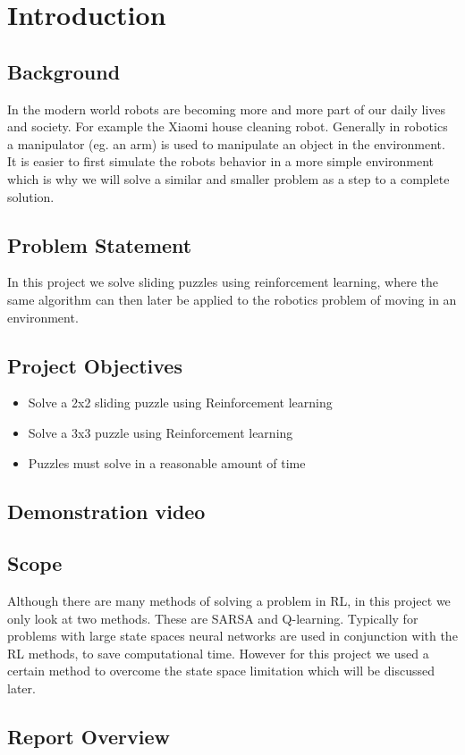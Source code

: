 \graphicspath{{introduction/fig/}}

\chapter{Introduction}
\label{chap:introduction}

\section{Background}
In the modern world robots are becoming more and more part of our daily lives and society. For example the Xiaomi house cleaning robot.
Generally in robotics a manipulator (eg.
an arm) is used to manipulate an object in
the environment. It is easier to
first simulate the robots behavior in a
more simple environment which is why we will solve a similar and smaller problem as a step to a complete solution.

\section{Problem Statement}
In this project
we solve sliding puzzles using
reinforcement learning, where the same algorithm can then later be applied to the robotics problem of moving in an environment.
\section{Project Objectives}
\begin{itemize}
	\item Solve a 2x2 sliding puzzle using Reinforcement learning
	\item Solve a 3x3 puzzle using Reinforcement learning
	\item Puzzles must solve in a reasonable amount of time
\end{itemize}

\section{\color{red} Demonstration video }

\section{Scope}
Although there are many methods of solving a problem in RL, in this project we only look at two methods. These are SARSA and Q-learning. Typically for problems with large state spaces neural networks are used in conjunction with the RL methods, to save computational time. However for this project we used a certain method to overcome the state space limitation which will be discussed later.

\section{\color{red}Report Overview}